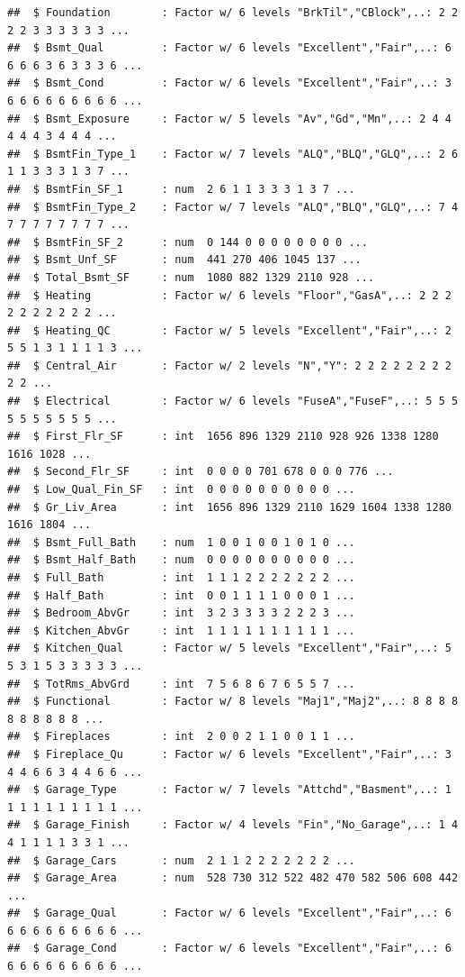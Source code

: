 \documentclass[
]{book}
\begin{document}
\begin{verbatim}
##  $ Foundation        : Factor w/ 6 levels "BrkTil","CBlock",..: 2 2 2 2 3 3 3 3 3 3 ...
##  $ Bsmt_Qual         : Factor w/ 6 levels "Excellent","Fair",..: 6 6 6 6 3 6 3 3 3 6 ...
##  $ Bsmt_Cond         : Factor w/ 6 levels "Excellent","Fair",..: 3 6 6 6 6 6 6 6 6 6 ...
##  $ Bsmt_Exposure     : Factor w/ 5 levels "Av","Gd","Mn",..: 2 4 4 4 4 4 3 4 4 4 ...
##  $ BsmtFin_Type_1    : Factor w/ 7 levels "ALQ","BLQ","GLQ",..: 2 6 1 1 3 3 3 1 3 7 ...
##  $ BsmtFin_SF_1      : num  2 6 1 1 3 3 3 1 3 7 ...
##  $ BsmtFin_Type_2    : Factor w/ 7 levels "ALQ","BLQ","GLQ",..: 7 4 7 7 7 7 7 7 7 7 ...
##  $ BsmtFin_SF_2      : num  0 144 0 0 0 0 0 0 0 0 ...
##  $ Bsmt_Unf_SF       : num  441 270 406 1045 137 ...
##  $ Total_Bsmt_SF     : num  1080 882 1329 2110 928 ...
##  $ Heating           : Factor w/ 6 levels "Floor","GasA",..: 2 2 2 2 2 2 2 2 2 2 ...
##  $ Heating_QC        : Factor w/ 5 levels "Excellent","Fair",..: 2 5 5 1 3 1 1 1 1 3 ...
##  $ Central_Air       : Factor w/ 2 levels "N","Y": 2 2 2 2 2 2 2 2 2 2 ...
##  $ Electrical        : Factor w/ 6 levels "FuseA","FuseF",..: 5 5 5 5 5 5 5 5 5 5 ...
##  $ First_Flr_SF      : int  1656 896 1329 2110 928 926 1338 1280 1616 1028 ...
##  $ Second_Flr_SF     : int  0 0 0 0 701 678 0 0 0 776 ...
##  $ Low_Qual_Fin_SF   : int  0 0 0 0 0 0 0 0 0 0 ...
##  $ Gr_Liv_Area       : int  1656 896 1329 2110 1629 1604 1338 1280 1616 1804 ...
##  $ Bsmt_Full_Bath    : num  1 0 0 1 0 0 1 0 1 0 ...
##  $ Bsmt_Half_Bath    : num  0 0 0 0 0 0 0 0 0 0 ...
##  $ Full_Bath         : int  1 1 1 2 2 2 2 2 2 2 ...
##  $ Half_Bath         : int  0 0 1 1 1 1 0 0 0 1 ...
##  $ Bedroom_AbvGr     : int  3 2 3 3 3 3 2 2 2 3 ...
##  $ Kitchen_AbvGr     : int  1 1 1 1 1 1 1 1 1 1 ...
##  $ Kitchen_Qual      : Factor w/ 5 levels "Excellent","Fair",..: 5 5 3 1 5 3 3 3 3 3 ...
##  $ TotRms_AbvGrd     : int  7 5 6 8 6 7 6 5 5 7 ...
##  $ Functional        : Factor w/ 8 levels "Maj1","Maj2",..: 8 8 8 8 8 8 8 8 8 8 ...
##  $ Fireplaces        : int  2 0 0 2 1 1 0 0 1 1 ...
##  $ Fireplace_Qu      : Factor w/ 6 levels "Excellent","Fair",..: 3 4 4 6 6 3 4 4 6 6 ...
##  $ Garage_Type       : Factor w/ 7 levels "Attchd","Basment",..: 1 1 1 1 1 1 1 1 1 1 ...
##  $ Garage_Finish     : Factor w/ 4 levels "Fin","No_Garage",..: 1 4 4 1 1 1 1 3 3 1 ...
##  $ Garage_Cars       : num  2 1 1 2 2 2 2 2 2 2 ...
##  $ Garage_Area       : num  528 730 312 522 482 470 582 506 608 442 ...
##  $ Garage_Qual       : Factor w/ 6 levels "Excellent","Fair",..: 6 6 6 6 6 6 6 6 6 6 ...
##  $ Garage_Cond       : Factor w/ 6 levels "Excellent","Fair",..: 6 6 6 6 6 6 6 6 6 6 ...

\end{verbatim}
\end{document}
